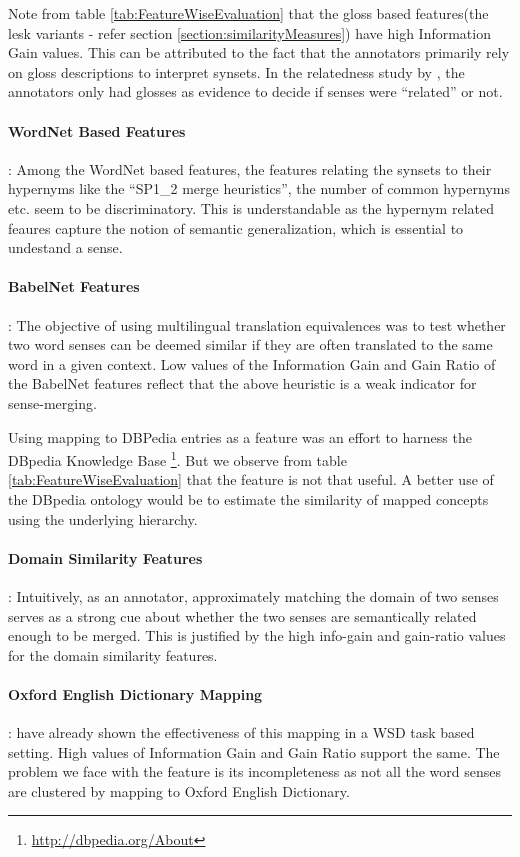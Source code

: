 Note from table \ref{tab:FeatureWiseEvaluation} that the gloss based features(the lesk variants - refer section \ref{section:similarityMeasures}) have high Information Gain values. This can be attributed to the fact that the annotators primarily rely on gloss descriptions to interpret synsets. In the relatedness study by \citep{mccarthy2006relating}, the annotators only had glosses as evidence to decide if senses were ``related'' or not.

\paragraph{WordNet Based Features}:
Among the WordNet based features, the features relating the synsets to their hypernyms like the ``SP1\_2 merge heuristics'', the number of common hypernyms etc. seem to be discriminatory. This is understandable as the hypernym related feaures capture the notion of semantic generalization, which is essential to undestand a sense. 

\paragraph{BabelNet Features}:
The objective of using multilingual translation equivalences was to test whether two word senses can be deemed similar if they are often translated to the same word in a given context. Low values of the Information Gain and Gain Ratio of the BabelNet features reflect that the above heuristic is a weak indicator for sense-merging. 

Using mapping to DBPedia entries as a feature was an effort to harness the DBpedia Knowledge Base \footnote{\url{http://dbpedia.org/About}}. But we observe from table \ref{tab:FeatureWiseEvaluation} that the feature is not that useful. A better use of the DBpedia ontology would be to estimate the similarity of mapped concepts using the underlying hierarchy.

\paragraph{Domain Similarity Features}:
Intuitively, as an annotator, approximately matching the domain of two senses serves as a strong cue about whether the two senses are semantically related enough to be merged. This is justified by the high info-gain and gain-ratio values for the domain similarity features.

\paragraph{Oxford English Dictionary Mapping}:
\citep{Navigli06meaningfulclustering} have already shown the effectiveness of this mapping in a WSD task based setting. High values of Information Gain and Gain Ratio support the same. The problem we face with the feature is its incompleteness as not all the word senses are clustered by mapping to Oxford English Dictionary.

